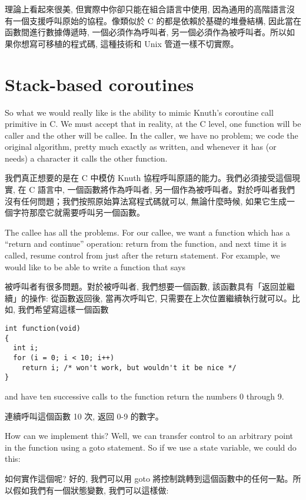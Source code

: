 \documentclass[12pt]{article}
\begin{document}
\begin{CJK}{UTF8}{bsmi}
理論上看起來很美, 但實際中你卻只能在組合語言中使用, 因為通用的高階語言沒有一個支援呼叫原始的協程。像類似於 C 的都是依賴於基礎的堆疊結構, 因此當在函數間進行數據傳遞時, 一個必須作為呼叫者, 另一個必須作為被呼叫者。所以如果你想寫可移植的程式碼, 這種技術和 Unix 管道一樣不切實際。

\section{Stack-based coroutines}

So what we would really like is the ability to mimic Knuth's coroutine call primitive in C. We must accept that in reality, at the C level, one function will be caller and the other will be callee. In the caller, we have no problem; we code the original algorithm, pretty much exactly as written, and whenever it has (or needs) a character it calls the other function.

我們真正想要的是在 C 中模仿 Knuth 協程呼叫原語的能力。我們必須接受這個現實, 在 C 語言中, 一個函數將作為呼叫者, 另一個作為被呼叫者。對於呼叫者我們沒有任何問題；我們按照原始算法寫程式碼就可以, 無論什麼時候, 如果它生成一個字符那麼它就需要呼叫另一個函數。

The callee has all the problems. For our callee, we want a function which has a ``return and continue'' operation: return from the function, and next time it is called, resume control from just after the return statement. For example, we would like to be able to write a function that says


 被呼叫者有很多問題。對於被呼叫者, 我們想要一個函數, 該函數具有「返回並繼續」的操作: 從函數返回後, 當再次呼叫它, 只需要在上次位置繼續執行就可以。比如, 我們希望寫這樣一個函數 

\begin{lstlisting}[basicstyle=\footnotesize, breaklines=true]
int function(void) 
{
  int i;
  for (i = 0; i < 10; i++)
    return i; /* won't work, but wouldn't it be nice */
}
\end{lstlisting}

and have ten successive calls to the function return the numbers 0 through 9.

連續呼叫這個函數 10 次, 返回 0-9 的數字。 

How can we implement this? Well, we can transfer control to an arbitrary point in the function using a goto statement. So if we use a state variable, we could do this:

如何實作這個呢? 好的, 我們可以用 goto 將控制跳轉到這個函數中的任何一點。所以假如我們有一個狀態變數, 我們可以這樣做:


\end{CJK}
\end{document}
